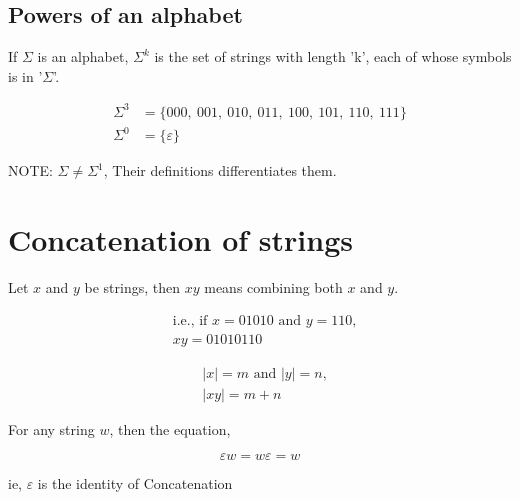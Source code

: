 \documentclass{article}
\begin{document}
\subsection{Powers of an alphabet}
If $\Sigma$ is an alphabet, $\Sigma^k$ is the set of strings with length 'k', each of whose symbols is in '$\Sigma$'.

\begin{align*}
    \Sigma^3 &= \{000,\ 001,\ 010,\ 011,\ 100,\ 101,\ 110,\ 111\} \\
    \Sigma^0 &= \{ \varepsilon \}
\end{align*}

NOTE: $\Sigma \neq \Sigma^1$, Their definitions differentiates them.

\section{Concatenation of strings}
Let $x$ and $y$ be strings, then $xy$ means combining both $x$ and $y$.

\begin{align*}
    &\text{i.e., if } x = 01010 \text{ and } y = 110, \\
    &xy = 01010110
\end{align*}

\begin{align*}
    &|x|=m \text{ and } |y| = n, \\
    &|xy| = m + n
\end{align*}

For any string $w$, then the equation,

\[ \varepsilon w = w \varepsilon = w \]

ie, $\varepsilon$ is the identity of Concatenation
\end{document}
